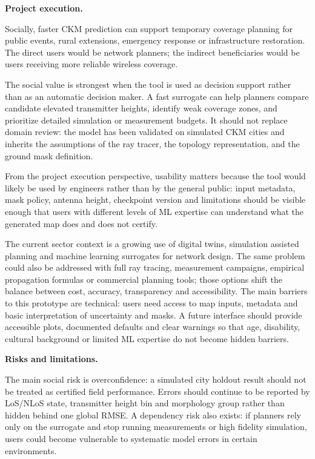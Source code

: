 \textbf{Project execution.}

Socially, faster CKM prediction can support temporary coverage planning for
public events, rural extensions, emergency response or infrastructure
restoration. The direct users would be network planners; the indirect
beneficiaries would be users receiving more reliable wireless coverage.

The social value is strongest when the tool is used as decision support rather
than as an automatic decision maker. A fast surrogate can help planners compare
candidate elevated transmitter heights, identify weak coverage zones, and
prioritize detailed simulation or measurement budgets. It should not replace domain review:
the model has been validated on simulated CKM cities and inherits the
assumptions of the ray tracer, the topology representation, and the ground mask
definition.

From the project execution perspective, usability matters because the tool would
likely be used by engineers rather than by the general public: input
metadata, mask policy, antenna height, checkpoint version and limitations
should be visible enough that users with different levels of ML expertise can
understand what the generated map does and does not certify.

The current sector context is a growing use of digital twins, simulation assisted
planning and machine learning surrogates for network design. The same problem
could also be addressed with full ray tracing, measurement campaigns, empirical
propagation formulas or commercial planning tools; those options shift the
balance between cost, accuracy, transparency and accessibility. The main barriers
to this prototype are technical: users need access to map inputs, metadata and
basic interpretation of uncertainty and masks. A future interface should provide
accessible plots, documented defaults and clear warnings so that age, disability,
cultural background or limited ML expertise do not become hidden barriers.

\textbf{Risks and limitations.}

The main social risk is overconfidence: a simulated city holdout result should
not be treated as certified field performance. Errors should continue to be
reported by LoS/NLoS state, transmitter height bin and morphology group rather
than hidden behind one global RMSE. A dependency risk also exists: if planners
rely only on the surrogate and stop running measurements or high fidelity
simulation, users could become vulnerable to systematic model errors in certain
environments.

